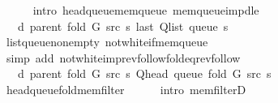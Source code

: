\begin{isabellebody}
\ \ \ \ \isamarkupfalse%
\ {\isacharparenleft}{\kern0pt}intro\ head{\isacharunderscore}{\kern0pt}queue{\isacharunderscore}{\kern0pt}mem{\isacharunderscore}{\kern0pt}queue\ mem{\isacharunderscore}{\kern0pt}queue{\isacharunderscore}{\kern0pt}imp{\isacharunderscore}{\kern0pt}d{\isacharunderscore}{\kern0pt}le{\isacharparenright}{\kern0pt}\isanewline
\ \ \isamarkupfalse%
\ \isamarkupfalse%
\ {\isachardoublequoteopen}{\isachardot}{\kern0pt}{\isachardot}{\kern0pt}{\isachardot}{\kern0pt}\ {\isacharequal}{\kern0pt}\ d\ {\isacharparenleft}{\kern0pt}parent\ {\isacharparenleft}{\kern0pt}fold\ G\ src\ s{\isacharparenright}{\kern0pt}{\isacharparenright}{\kern0pt}\ {\isacharparenleft}{\kern0pt}last\ {\isacharparenleft}{\kern0pt}Q{\isacharunderscore}{\kern0pt}list\ {\isacharparenleft}{\kern0pt}queue\ s{\isacharparenright}{\kern0pt}{\isacharparenright}{\kern0pt}{\isacharparenright}{\kern0pt}{\isachardoublequoteclose}\isanewline
\ \ \ \ \isamarkupfalse%
\ list{\isacharunderscore}{\kern0pt}queue{\isacharunderscore}{\kern0pt}non{\isacharunderscore}{\kern0pt}empty\ not{\isacharunderscore}{\kern0pt}white{\isacharunderscore}{\kern0pt}if{\isacharunderscore}{\kern0pt}mem{\isacharunderscore}{\kern0pt}queue\isanewline
\ \ \ \ \isamarkupfalse%
\ {\isacharparenleft}{\kern0pt}simp\ add{\isacharcolon}{\kern0pt}\ not{\isacharunderscore}{\kern0pt}white{\isacharunderscore}{\kern0pt}imp{\isacharunderscore}{\kern0pt}rev{\isacharunderscore}{\kern0pt}follow{\isacharunderscore}{\kern0pt}fold{\isacharunderscore}{\kern0pt}eq{\isacharunderscore}{\kern0pt}rev{\isacharunderscore}{\kern0pt}follow{\isacharparenright}{\kern0pt}\isanewline
\ \ \isamarkupfalse%
\ \isamarkupfalse%
\ {\isachardoublequoteopen}{\isachardot}{\kern0pt}{\isachardot}{\kern0pt}{\isachardot}{\kern0pt}\ {\isasymle}\ d\ {\isacharparenleft}{\kern0pt}parent\ {\isacharparenleft}{\kern0pt}fold\ G\ src\ s{\isacharparenright}{\kern0pt}{\isacharparenright}{\kern0pt}\ {\isacharparenleft}{\kern0pt}Q{\isacharunderscore}{\kern0pt}head\ {\isacharparenleft}{\kern0pt}queue\ {\isacharparenleft}{\kern0pt}fold\ G\ src\ s{\isacharparenright}{\kern0pt}{\isacharparenright}{\kern0pt}{\isacharparenright}{\kern0pt}{\isachardoublequoteclose}\isanewline
\ \ \ \ \isamarkupfalse%
\ head{\isacharunderscore}{\kern0pt}queue{\isacharunderscore}{\kern0pt}fold{\isacharunderscore}{\kern0pt}mem{\isacharunderscore}{\kern0pt}filter\isanewline
\ \ \ \ \isamarkupfalse%
\ {\isacharparenleft}{\kern0pt}intro\ mem{\isacharunderscore}{\kern0pt}filterD{\isacharparenleft}{\kern0pt}{}{\isacharparenright}{\kern0pt}{\isacharparenright}{\kern0pt}\isanewline

\end{isabellebody}
